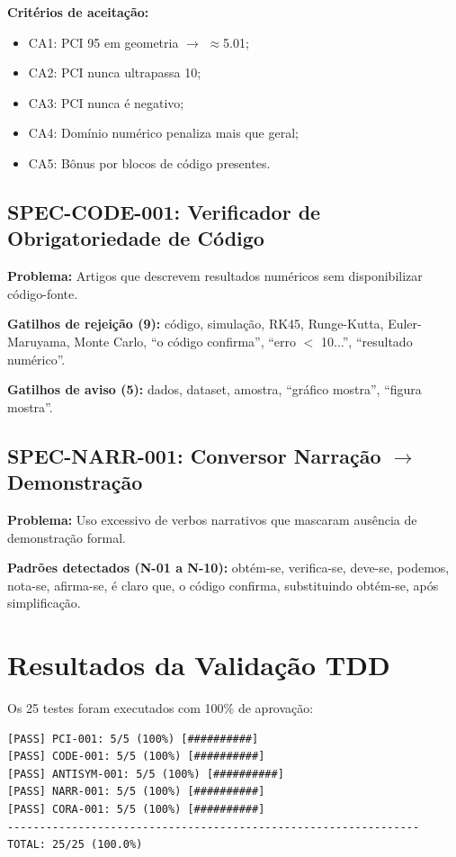 \documentclass[12pt,a4paper,sumario=tradicional]{abntex2}
\begin{document}
\textbf{Critérios de aceitação:}
\begin{itemize}
    \item CA1: PCI 95 em geometria $\to$ $\approx$5.01;
    \item CA2: PCI nunca ultrapassa 10;
    \item CA3: PCI nunca é negativo;
    \item CA4: Domínio numérico penaliza mais que geral;
    \item CA5: Bônus por blocos de código presentes.
\end{itemize}

\section{SPEC-CODE-001: Verificador de Obrigatoriedade de Código}

\textbf{Problema:} Artigos que descrevem resultados numéricos sem disponibilizar código-fonte.

\textbf{Gatilhos de rejeição (9):} código, simulação, RK45, Runge-Kutta, Euler-Maruyama, Monte Carlo, ``o código confirma'', ``erro $<$ 10...'', ``resultado numérico''.

\textbf{Gatilhos de aviso (5):} dados, dataset, amostra, ``gráfico mostra'', ``figura mostra''.

\section{SPEC-NARR-001: Conversor Narração $\to$ Demonstração}

\textbf{Problema:} Uso excessivo de verbos narrativos que mascaram ausência de demonstração formal.

\textbf{Padrões detectados (N-01 a N-10):} obtém-se, verifica-se, deve-se, podemos, nota-se, afirma-se, é claro que, o código confirma, substituindo obtém-se, após simplificação.

\chapter{Resultados da Validação TDD}

Os 25 testes foram executados com 100\% de aprovação:

\begin{lstlisting}[caption=Saída do TDD Academic v2.0 (OOP)]
[PASS] PCI-001: 5/5 (100%) [##########]
[PASS] CODE-001: 5/5 (100%) [##########]
[PASS] ANTISYM-001: 5/5 (100%) [##########]
[PASS] NARR-001: 5/5 (100%) [##########]
[PASS] CORA-001: 5/5 (100%) [##########]
----------------------------------------------------------------
TOTAL: 25/25 (100.0%)
\end{lstlisting}
\end{document}
